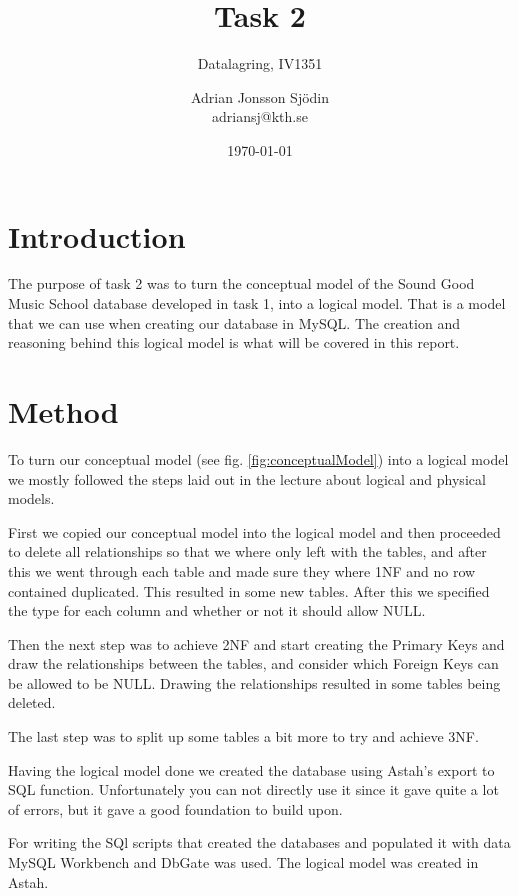 \documentclass[a4paper]{scrreprt}
\title{Task 2}
\subtitle{Datalagring, IV1351}
\author{Adrian Jonsson Sjödin \\ adriansj@kth.se}
\date{\today}
\begin{document}
\maketitle

\tableofcontents %

\chapter{Introduction}
The purpose of task 2 was to turn the conceptual model of the Sound Good Music School database developed in task 1, into a logical model. That is a model that we can 
use when creating our database in MySQL. The creation and reasoning behind this logical model is what will be covered in this report.

\chapter{Method}
To turn our conceptual model (see fig. \ref{fig:conceptualModel}) into a logical model we mostly followed the steps laid out in the lecture about logical and physical models.

First we copied our conceptual model into the logical model and then proceeded to delete all relationships so that we where only left with the tables, and after this we 
went through each table and made sure they where 1NF and no row contained duplicated. This resulted in some new tables. After this we specified the type for each column 
and whether or not it should allow NULL.

Then the next step was to achieve 2NF and start creating the Primary Keys and draw the relationships between the tables, and consider which Foreign Keys can be allowed 
to be NULL. Drawing the relationships resulted in some tables being deleted.

The last step was to split up some tables a bit more to try and achieve 3NF.

Having the logical model done we created the database using Astah's export to SQL function. Unfortunately you can not directly use it since it gave quite a lot of errors,
but it gave a good foundation to build upon.

For writing the SQl scripts that created the databases and populated it with data MySQL Workbench and DbGate was used. The logical model was created in Astah. 
\end{document}
